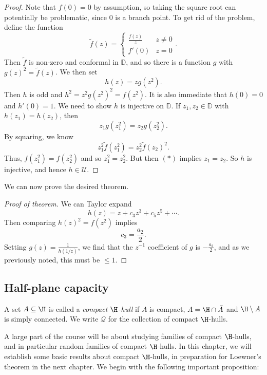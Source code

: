 \documentclass[a4paper]{article}
\renewcommand\D{\mathbb{D}}
\begin{document}
\begin{proof}
  Note that $f(0) = 0$ by assumption, so taking the square root can potentially be problematic, since $0$ is a branch point. To get rid of the problem, define the function
  \[
    \tilde{f}(z) =
    \begin{cases}
      \frac{f(z)}{z} & z \not =0\\
      f'(0) & z = 0
    \end{cases}.
  \]
  Then $\tilde{f}$ is non-zero and conformal in $\D$, and so there is a function $g$ with $g(z)^2 = \tilde{f}(z)$. We then set
  \[
    h(z) = z g(z^2).
  \]
  Then $h$ is odd and $h^2 = z^2 g(z^2)^2 = f(z^2)$. It is also immediate that $h(0) = 0 $ and $h'(0) = 1$. We need to show $h$ is injective on $\D$. If $z_1, z_2 \in \D$ with $h(z_1) = h(z_2)$, then
  \[
    z_1 g(z_1^2) = z_2 g(z_2^2).\tag{$*$}
  \]
  By squaring, we know
  \[
    z_1^2 \tilde{f}(z_1^2) = z_2^2 \tilde{f}(z_2)^2.
  \]
  Thus, $f(z_1^2) = f(z_2^2)$ and so $z_1^2 = z_2^2$. But then $(*)$ implies $z_1 = z_2$. So $h$ is injective, and hence $h \in \mathcal{U}$.
\end{proof}

We can now prove the desired theorem.
\begin{proof}[Proof of theorem]
  We can Taylor expand
  \[
    h(z) = z + c_3 z^3 + c_5 z^5 + \cdots.
  \]
  Then comparing $h(z)^2 = f(z^2)$ implies
  \[
    c_3 = \frac{a_2}{2}.
  \]
  Setting $g(z) = \frac{1}{h(1/z)}$, we find that the $z^{-1}$ coefficient of $g$ is $-\frac{a_2}{2}$, and as we previously noted, this must be $\leq 1$.
\end{proof}
\subsection{Half-plane capacity}

\begin{defi}
  A set $A \subseteq \H$ is called a \emph{compact $\H$-hull} if $A$ is compact, $A = \H \cap \bar{A}$ and $\H \setminus A$ is simply connected. We write $\mathcal{Q}$ for the collection of compact $\H$-hulls.
\end{defi}
A large part of the course will be about studying families of compact $\H$-hulls, and in particular random families of compact $\H$-hulls. In this chapter, we will establish some basic results about compact $\H$-hulls, in preparation for Loewner's theorem in the next chapter. We begin with the following important proposition:
\end{document}
